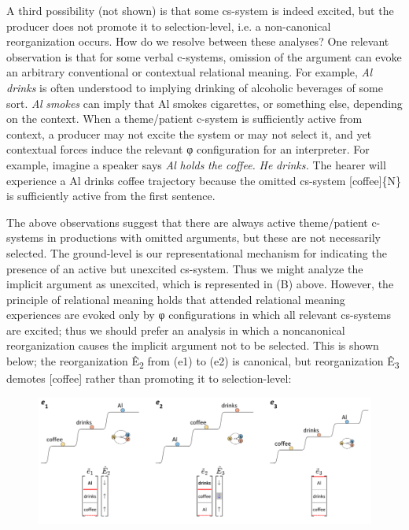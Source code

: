  A third possibility (not shown) is that some cs-system is indeed excited, but the producer does not promote it to selection-level, i.e. a non-canonical reorganization occurs. How do we resolve between these analyses? One relevant observation is that for some verbal c-systems, omission of the argument can evoke an arbitrary conventional or contextual relational meaning. For example, \textit{Al} \textit{drinks} is often understood to implying drinking of alcoholic beverages of some sort. \textit{Al} \textit{smokes} can imply that Al smokes cigarettes, or something else, depending on the context. When a theme/patient c-system is sufficiently active from context, a producer may not excite the system or may not select it, and yet contextual forces induce the relevant φ configuration for an interpreter. For example, imagine a speaker says \textit{Al} \textit{holds} \textit{the} \textit{coffee.} \textit{He} \textit{drinks.} The hearer will experience a {\textbar}Al drinks coffee{\textbar} trajectory because the omitted cs-system [coffee]\{N\} is sufficiently active from the first sentence.

  The above observations suggest that there are always active theme/patient c-systems in productions with omitted arguments, but these are not necessarily selected. The ground-level is our representational mechanism for indicating the presence of an active but unexcited cs-system. Thus we might analyze the implicit argument as unexcited, which is represented in (B) above. However, the principle of relational meaning holds that attended relational meaning experiences are evoked only by φ configurations in which all relevant cs-systems are excited; thus we should prefer an analysis in which a noncanonical reorganization causes the implicit argument not to be selected. This is shown below; the reorganization Ê\textsubscript{2} from (e1) to (e2) is canonical, but reorganization Ê\textsubscript{3} demotes [coffee] rather than promoting it to selection-level:

  
\begin{figure}
\includegraphics[width=\textwidth]{figures/Tilsen-img87.png}
\caption{\missingcaption}
\label{fig:}
\end{figure}
 

